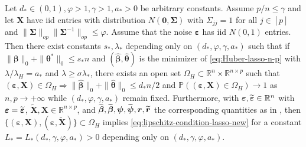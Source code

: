 \documentclass[11pt]{amsart}
\numberwithin{equation}{section}
\numberwithin{equation}{section}
\def\real{{\mathbb{R}}}
\def\R{{\real}}
\def\P{{\mathbb{P}}}
\def\mathbold{\boldsymbol} %
\def\br{\mathbold{r}}\def\rhat{\widehat{r}}\def\rtil{\widetilde{r}}\def\rbar{{\overline r}}\def\brbar{{\overline \br}}
\def\bX{\mathbold{X}}\def\hbX{{\widehat{\bX}}}\def\tbX{{\widetilde{\bX}}}\def\bXbar{{\overline \bX}}
\def\bbeta{\mathbold{\beta}}\def\betahat{\widehat{\beta}}\def\hbeta{\widehat{\beta}}
\def\hbbeta{{{\widehat{\bbeta}}}}
\def\tbbeta{\widetilde{\bbeta}}
\def\ep{\varepsilon}\def\eps{\epsilon}\def\veps{\varepsilon}
\def\bep{ {\mathbold{\ep} }}
\def\btheta{\mathbold{\theta}}\def\thetahat{\widehat{\theta}}\def\htheta{\widehat{\theta}}
\def\hbtheta{{\widehat{\btheta}}}\def\tbtheta{{\widetilde{\btheta}}}
\def\bSigma{\mathbold{\Sigma}}\def\hbSigma{{\widehat{\bSigma}}}
\def\bpsi{\mathbold{\psi}}\def\psihat{\widehat{\psi}}\def\hpsi{\widehat{\psi}}
\newcommand\pb[1]{{ #1 }}
\begin{document}
\begin{proposition}
    \label{prop:Omega_H}
    Let $d_*\in(0,1),\varphi>1,\gamma>1,a_*>0$ be arbitrary constants.
    Assume $p/n\le \gamma$ and
    let $\bX$ have iid entries with distribution $N(\mathbf 0,\bSigma)$
    with $\Sigma_{jj}=1$ for all $j\in[p]$ and
    $\|\bSigma\|_{op}\|\bSigma^{-1}\|_{op}\le \varphi$.
    Assume that the noise $\bep$ has iid $N(0,1)$ entries.
    Then there exist constants $s_*,\lambda_*$ depending only
    on $(d_*,\varphi,\gamma,a_*)$
    such that
    if $\|\bbeta\|_0+\|\btheta^*\|_0\le s_*n$ and 
    $(\hbbeta,\hbtheta)$
    is the minimizer of \eqref{eq:Huber-lasso-n-p}
    with $\lambda/\lambda_H=a_*$
    and  $\lambda\ge \pb{\sigma}\lambda_*$, there exists
    an open set $\Omega_{H}\subset \R^n\times \R^{n\times p}$ 
    such that
    $(\bep,\bX)\in\Omega_{H}\Rightarrow \|\hbbeta\|_0+\|\hbtheta\|_0\le d_*n/2$
    and $\P((\bep,\bX)\in\Omega_{H})\to 1$ as
    $n,p\to+\infty$ while $(d_*,\varphi,\gamma,a_*)$ remain fixed.
    Furthermore, 
    with $\bep,\tbep\in\R^n$ with $\bep=\tbep$,
    $\tbX,\bX\in\R^{n\times p}$,
    and $\hbbeta,\tbbeta,\bpsi,\tbpsi, \br, \tbr$
    the corresponding quantities as in ,
    then 
    $\{(\bep,\bX),
    (\bep,\tbX)\}
    \subset\Omega_{H}$ implies
    \eqref{eq:lipschitz-condition-lasso-new}
    for a constant $L_*=L_*(d_*,\gamma,\varphi,a_*)>0$ depending
    only on $(d_*,\gamma,\varphi,a_*)$.
\end{proposition}
\end{document}

